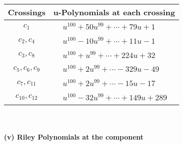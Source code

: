 \documentclass[1p]{elsarticle_modified}
\theoremstyle{definition}
\begin{document}
\begin{tabular}{m{50pt}|m{274pt}}
Crossings & \hspace{64pt}u-Polynomials at each crossing \\
\hline $$\begin{aligned}c_{1}\end{aligned}$$&$\begin{aligned}
&u^{100}+50 u^{99}+\cdots+79 u+1
\end{aligned}$\\
\hline $$\begin{aligned}c_{2},c_{4}\end{aligned}$$&$\begin{aligned}
&u^{100}-10 u^{99}+\cdots+11 u-1
\end{aligned}$\\
\hline $$\begin{aligned}c_{3},c_{8}\end{aligned}$$&$\begin{aligned}
&u^{100}+u^{99}+\cdots+224 u+32
\end{aligned}$\\
\hline $$\begin{aligned}c_{5},c_{6},c_{9}\end{aligned}$$&$\begin{aligned}
&u^{100}+2 u^{99}+\cdots-329 u-49
\end{aligned}$\\
\hline $$\begin{aligned}c_{7},c_{11}\end{aligned}$$&$\begin{aligned}
&u^{100}+2 u^{99}+\cdots-15 u-17
\end{aligned}$\\
\hline $$\begin{aligned}c_{10},c_{12}\end{aligned}$$&$\begin{aligned}
&u^{100}-32 u^{99}+\cdots+149 u+289
\end{aligned}$\\
\hline
\end{tabular}\\~\\
\newpage\renewcommand{\arraystretch}{1}
\flushleft \textbf{(v) Riley Polynomials at the component}\newline \\
\end{document}
